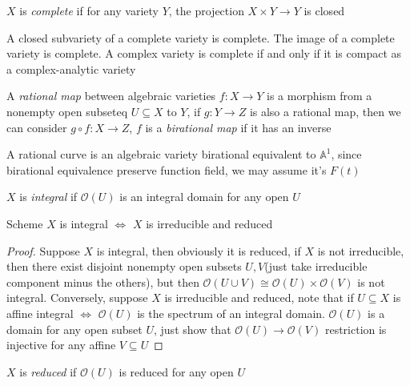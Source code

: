 \documentclass[main]{subfiles}
\begin{document}
\begin{definition}
$X$ is \textit{complete} if for any variety $Y$, the projection $X\times Y\to Y$ is closed
\end{definition}

\begin{proposition}
A closed subvariety of a complete variety is complete. The image of a complete variety is complete. A complex variety is complete if and only if it is compact as a complex-analytic variety
\end{proposition}

\begin{definition}
A \textit{rational map} between algebraic varieties $f:X\to Y$ is a morphism from a nonempty open subseteq $U\subseteq X$ to $Y$, if $g:Y\to Z$ is also a rational map, then we can consider $g\circ f:X\to Z$, $f$ is a \textit{birational map} if it has an inverse
\end{definition}

\begin{definition}
A rational curve is an algebraic variety birational equivalent to $\mathbb A^1$, since birational equivalence preserve function field, we may assume it's $F(t)$
\end{definition}

\begin{definition}
$X$ is \textit{integral} if $\mathcal O(U)$ is an integral domain for any open $U$
\end{definition}

\begin{lemma}
Scheme $X$ is integral $\iff$ $X$ is irreducible and reduced
\end{lemma}

\begin{proof}
Suppose $X$ is integral, then obviously it is reduced, if $X$ is not irreducible, then there exist disjoint nonempty open subsets $U,V$(just take irreducible component minus the others), but then $\mathcal O(U\cup V)\cong \mathcal O(U)\times\mathcal O(V)$ is not integral. Conversely, suppose $X$ is irreducible and reduced, note that if $U\subseteq X$ is affine integral $\iff$ $\mathcal O(U)$ is the spectrum of an integral domain. $\mathcal O(U)$ is a domain for any open subset $U$, just show that $\mathcal O(U)\to\mathcal O(V)$ restriction is injective for any affine $V\subseteq U$
\end{proof}

\begin{definition}
$X$ is \textit{reduced} if $\mathcal O(U)$ is reduced for any open $U$
\end{definition}
\end{document}
